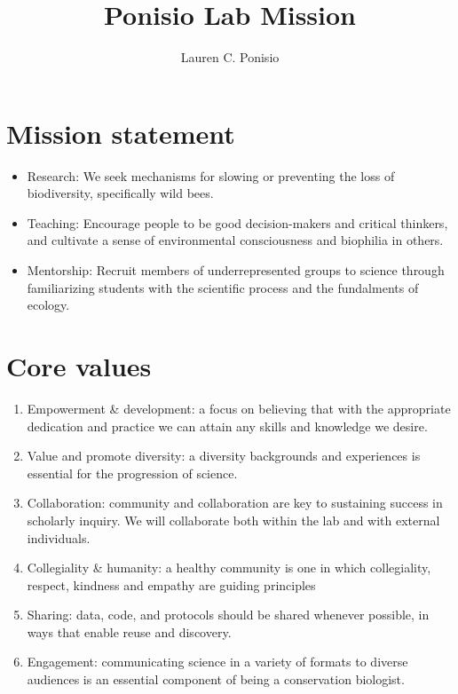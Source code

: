 \documentclass[12pt]{article}
\title{Ponisio Lab Mission}
\author{Lauren C. Ponisio}
\begin{document}
\maketitle

\section{Mission statement}
\begin{itemize}
\item Research: We seek mechanisms for slowing or preventing the loss
  of biodiversity, specifically wild bees. 
\item Teaching: Encourage people to be good decision-makers
and critical thinkers, and cultivate a sense of environmental
consciousness and biophilia in others.
\item Mentorship: Recruit members of underrepresented groups to
  science through familiarizing students with the scientific process
  and the fundalments of ecology.
\end{itemize}

\section{Core values}

\begin{enumerate}
\item Empowerment \& development: a focus on believing that with the
  appropriate dedication and practice we can attain any skills and
  knowledge we desire.
\item Value and promote diversity: a diversity backgrounds and experiences is essential
  for the progression of science.
\item Collaboration: community and collaboration are key to sustaining
  success in scholarly inquiry. We will collaborate both within the
  lab and with external individuals.
\item Collegiality \& humanity: a healthy community is one in which
  collegiality, respect, kindness and empathy are guiding principles
\item Sharing: data, code, and protocols should be shared whenever possible,
  in ways that enable reuse and discovery.
\item Engagement: communicating science in a variety of formats to
  diverse audiences is an essential component of being a conservation
  biologist.
\end{enumerate}
\end{document}
